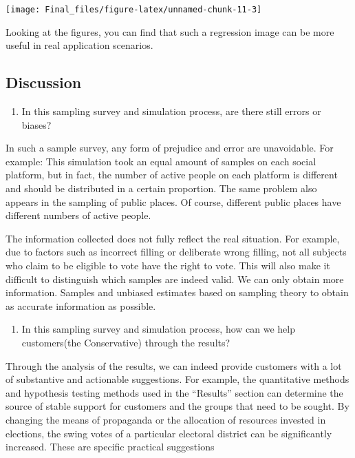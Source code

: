 \documentclass[
]{article}
\providecommand{\tightlist}{%
  \setlength{\itemsep}{0pt}\setlength{\parskip}{0pt}}
\begin{document}
\begin{center}\texttt{[image: Final\_files/figure-latex/unnamed-chunk-11-3]} \end{center}

Looking at the figures, you can find that such a regression image can be
more useful in real application scenarios.

\hypertarget{discussion}{%
\subsection{Discussion}\label{discussion}}

\begin{enumerate}
\def\labelenumi{\arabic{enumi}.}
\tightlist
\item
  In this sampling survey and simulation process, are there still errors
  or biases?
\end{enumerate}

In such a sample survey, any form of prejudice and error are
unavoidable. For example: This simulation took an equal amount of
samples on each social platform, but in fact, the number of active
people on each platform is different and should be distributed in a
certain proportion. The same problem also appears in the sampling of
public places. Of course, different public places have different numbers
of active people.

The information collected does not fully reflect the real situation. For
example, due to factors such as incorrect filling or deliberate wrong
filling, not all subjects who claim to be eligible to vote have the
right to vote. This will also make it difficult to distinguish which
samples are indeed valid. We can only obtain more information. Samples
and unbiased estimates based on sampling theory to obtain as accurate
information as possible.

\begin{enumerate}
\def\labelenumi{\arabic{enumi}.}
\setcounter{enumi}{1}
\tightlist
\item
  In this sampling survey and simulation process, how can we help
  customers(the Conservative) through the results?
\end{enumerate}

Through the analysis of the results, we can indeed provide customers
with a lot of substantive and actionable suggestions. For example, the
quantitative methods and hypothesis testing methods used in the
``Results'' section can determine the source of stable support for
customers and the groups that need to be sought. By changing the means
of propaganda or the allocation of resources invested in elections, the
swing votes of a particular electoral district can be significantly
increased. These are specific practical suggestions
\end{document}
